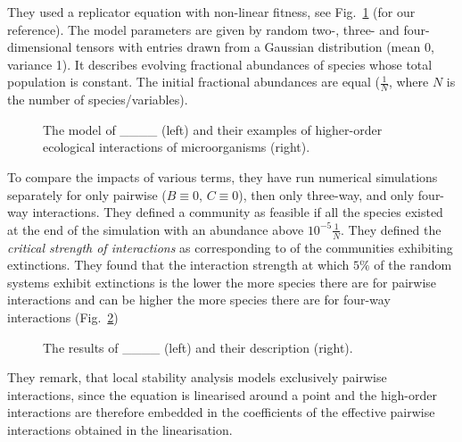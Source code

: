 \begin{itemize}
    They used a replicator equation with non-linear fitness, see Fig.~\ref{Bairey_eq_ex} (for our reference). The model parameters are given by random two-, three- and four-dimensional tensors with entries drawn from a Gaussian distribution (mean 0, variance 1). It describes evolving fractional abundances of species whose total population is constant. The initial fractional abundances are equal ($\tfrac{1}{N}$, where $N$ is the number of species/variables).
    \begin{figure}[h!]
	\begin{center}
        \caption{The model of ____ (left) and their examples of higher-order ecological interactions of microorganisms (right).} 
    	\label{Bairey_eq_ex}
    \end{center}
    \end{figure}
    To compare the impacts of various terms, they have run numerical simulations separately for only pairwise ($B\equiv 0$, $C\equiv 0$), then only three-way, and only four-way interactions.
    They defined a community as feasible if all the species existed at the end of the simulation with an abundance above $10^{-5}\tfrac{1}{N}$. They defined the \emph{critical strength of interactions} as corresponding to  of the communities exhibiting extinctions. 
    They found that the interaction strength at which $5\%$ of the random systems exhibit extinctions is the lower the more species there are for pairwise interactions and can be higher the more species there are for four-way interactions (Fig.~\ref{Bairey_res})

    \begin{figure}[h!]
	\begin{center}
        \caption{The results of ____ (left) and their description (right).} 
    	\label{Bairey_res}
    \end{center}
    \end{figure}
    

They remark, that local stability analysis models exclusively pairwise interactions, since the equation is linearised around a point and the high-order interactions are therefore embedded in the coefficients of the effective pairwise interactions obtained in the linearisation.


\end{itemize}
